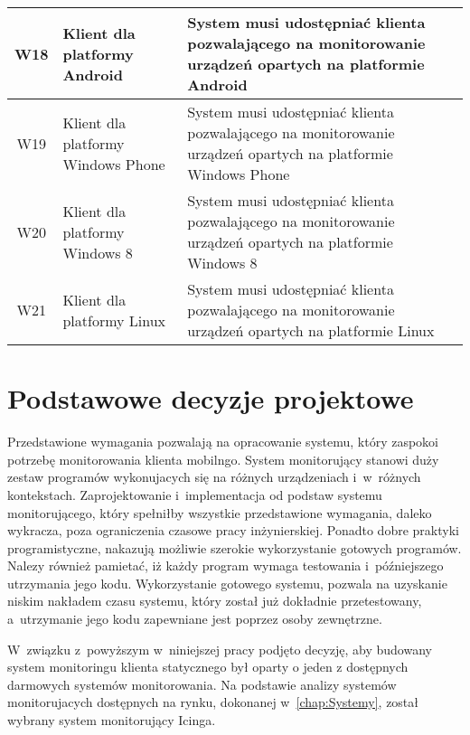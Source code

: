 \begin{longtable}[c]{|c||p{3.5cm}|p{9cm}|}
  W18 & \raggedright{Klient dla platformy Android} & \raggedright{System musi udostępniać klienta pozwalającego na monitorowanie urządzeń opartych na platformie Android} \tabularnewline
  \hline

  W19 & \raggedright{Klient dla platformy Windows Phone} & \raggedright{System musi udostępniać klienta pozwalającego na monitorowanie urządzeń opartych na platformie Windows Phone} \tabularnewline 
  \hline

  W20 & \raggedright{Klient dla platformy Windows 8} & \raggedright{System musi udostępniać klienta pozwalającego na monitorowanie urządzeń opartych na platformie Windows 8} \tabularnewline
  \hline

  W21 & \raggedright{Klient dla platformy Linux} & \raggedright{System musi udostępniać klienta pozwalającego na monitorowanie urządzeń opartych na platformie Linux} \tabularnewline
  \hline
\end{longtable}

\section[Decyzje projektowe][Podstawowe decyzje projektowe]{Podstawowe decyzje projektowe}

Przedstawione wymagania pozwalają na opracowanie systemu, który
zaspokoi potrzebę monitorowania klienta mobilngo. System monitorujący
stanowi duży zestaw programów wykonujacych się na różnych urządzeniach
i~w~różnych kontekstach. Zaprojektowanie i~implementacja od podstaw
systemu monitorującego, który spełniłby wszystkie przedstawione
wymagania, daleko wykracza, poza ograniczenia czasowe pracy
inżynierskiej. Ponadto dobre praktyki programistyczne, nakazują
możliwie szerokie wykorzystanie gotowych programów. Nalezy również
pamietać, iż każdy program wymaga testowania i~późniejszego utrzymania
jego kodu. Wykorzystanie gotowego systemu, pozwala na uzyskanie niskim
nakładem czasu systemu, który został już dokładnie przetestowany,
a~utrzymanie jego kodu zapewniane jest poprzez osoby zewnętrzne.

W~związku z~powyższym w~niniejszej pracy podjęto decyzję, aby budowany
system monitoringu klienta statycznego był oparty o jeden z dostępnych
darmowych systemów monitorowania. Na podstawie analizy systemów
monitorujacych dostępnych na rynku, dokonanej w~\ref{chap:Systemy},
został wybrany system monitorujący Icinga.

